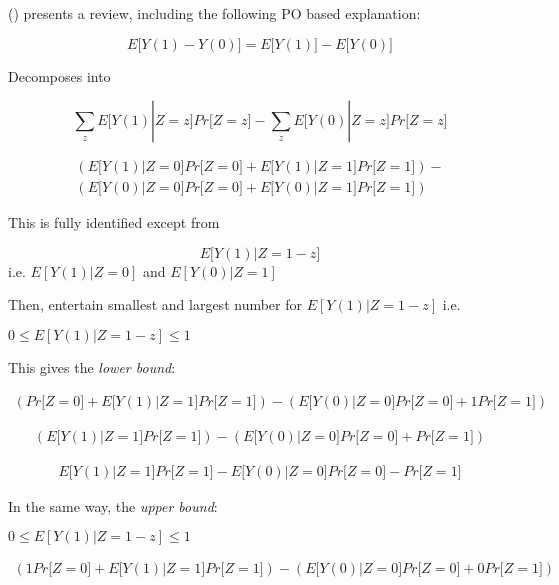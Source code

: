 \documentclass{article}
\begin{document}
(\cite{richardson2014nonparametric}) presents a review, including the following PO based explanation:

\[ E{[}Y(1)-Y(0){]} = E{[}Y(1){]} - E{[}Y(0){]}\]

Decomposes into

\[ \sum_z E{[}Y(1)| Z=z{]}Pr{[}Z=z{]} - \sum_z
E{[}Y(0)| Z=z{]}Pr{[}Z=z{]}\]

\begin{equation*}
\begin{split}
(E{[}Y(1)| Z=0{]}Pr{[}Z=0{]} + E{[}Y(1)| Z=1{]}Pr{[}Z=1{]}) - \\
(E{[}Y(0)| Z=0{]}Pr{[}Z=0{]} + E{[}Y(0)| Z=1{]}Pr{[}Z=1{]})
\end{split}
\end{equation*}

This is fully identified except from

\[ E{[}Y(1)| Z=1-z{]} \] i.e. \(E[Y(1)|Z=0]\) and \(E[Y(0)|Z=1]\)

Then, entertain smallest and largest number for \(E[Y(1)|Z=1-z]\) i.e.~

\(0 \leq E[Y(1)|Z=1-z] \leq 1\)

This gives the \emph{lower bound}:

\begin{equation*}
\begin{split}
 (Pr{[}Z=0{]} + E{[}Y(1)| Z=1{]}Pr{[}Z=1{]}) -
(E{[}Y(0)| Z=0{]}Pr{[}Z=0{]} + 1 Pr{[}Z=1{]})
\end{split}
\end{equation*}

\begin{equation*}
\begin{split}
 (E{[}Y(1)| Z=1{]}Pr{[}Z=1{]}) -
(E{[}Y(0)| Z=0{]}Pr{[}Z=0{]} + Pr{[}Z=1{]})
\end{split}
\end{equation*}

\begin{equation*}
\begin{split}
 E{[}Y(1)| Z=1{]}Pr{[}Z=1{]} -
E{[}Y(0)| Z=0{]}Pr{[}Z=0{]} - Pr{[}Z=1{]}
\end{split}
\end{equation*}

In the same way, the \emph{upper bound}:

\(0 \leq E[Y(1)|Z=1-z] \leq 1\)

\begin{equation*}
\begin{split}
(1 Pr{[}Z=0{]} + E{[}Y(1)| Z=1{]}Pr{[}Z=1{]}) -
(E{[}Y(0)| Z=0{]}Pr{[}Z=0{]} + 0 Pr{[}Z=1{]})
\end{split}
\end{equation*}
\end{document}
